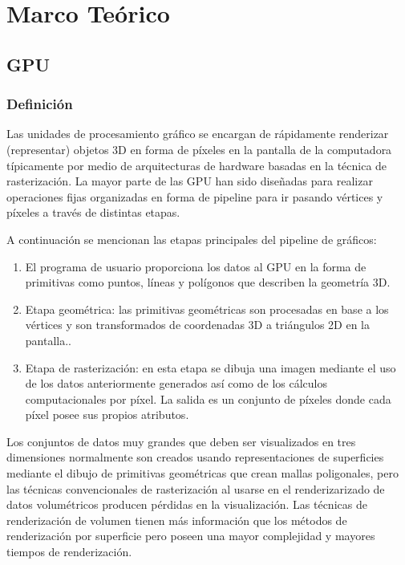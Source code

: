 \chapter{Marco Teórico}%

\section{GPU}
\subsection{Definición}

Las unidades de procesamiento gráfico se encargan de rápidamente renderizar (representar) objetos 3D en forma de píxeles en la pantalla de la computadora típicamente por medio de arquitecturas de hardware basadas en la técnica de rasterización. La mayor parte de las GPU han sido diseñadas para realizar operaciones fijas organizadas en forma de pipeline para ir pasando vértices y píxeles a través de distintas etapas.  

A continuación se mencionan las etapas principales del pipeline de gráficos:
\begin{enumerate}

\item El programa de usuario proporciona los datos al GPU en la forma de primitivas como puntos, líneas y polígonos que describen la geometría 3D. 
\item Etapa geométrica: las primitivas geométricas son procesadas en base a los vértices y son transformados de coordenadas 3D a triángulos 2D en la pantalla.. 
\item Etapa de rasterización: en esta etapa se dibuja una imagen mediante el uso de los datos anteriormente generados así como de los cálculos computacionales por píxel. La salida es un conjunto de píxeles donde cada píxel posee sus propios atributos.  

\end{enumerate}

Los conjuntos de datos muy grandes que deben ser visualizados en tres dimensiones normalmente son creados usando representaciones de superficies mediante el dibujo de primitivas geométricas que crean mallas poligonales, pero las técnicas convencionales de rasterización al usarse en el renderizarizado de datos volumétricos producen pérdidas en la visualización. Las técnicas de  renderización de volumen tienen más información que los métodos de renderización por  superficie pero poseen una mayor complejidad y mayores tiempos de renderización.


